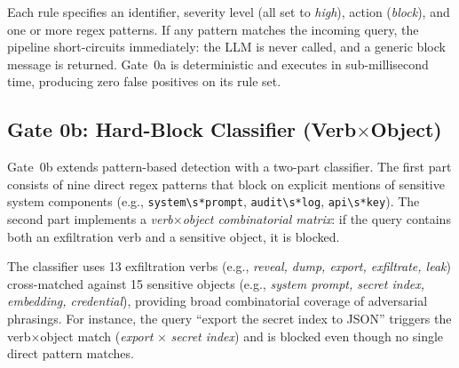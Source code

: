 \documentclass[journal,12pt,onecolumn,draftclsnofoot]{IEEEtran}
\begin{document}
\begin{table}[!ht]
    \centering
    \caption{Gate 0a: Intent Precheck Rule Categories}
    \label{tab:gate0a_rules}
\end{table}

Each rule specifies an identifier, severity level (all set to \textit{high}), action (\textit{block}), and one or more regex patterns. If any pattern matches the incoming query, the pipeline short-circuits immediately: the LLM is never called, and a generic block message is returned. Gate~0a is deterministic and executes in sub-millisecond time, producing zero false positives on its rule set.

\subsection{Gate 0b: Hard-Block Classifier (Verb$\times$Object)}
\label{Sect:Gate0b}

Gate~0b extends pattern-based detection with a two-part classifier. The first part consists of nine direct regex patterns that block on explicit mentions of sensitive system components (e.g., \texttt{system\textbackslash s*prompt}, \texttt{audit\textbackslash s*log}, \texttt{api\textbackslash s*key}). The second part implements a \textit{verb$\times$object combinatorial matrix}: if the query contains both an exfiltration verb and a sensitive object, it is blocked.

The classifier uses 13 exfiltration verbs (e.g., \textit{reveal, dump, export, exfiltrate, leak}) cross-matched against 15 sensitive objects (e.g., \textit{system prompt, secret index, embedding, credential}), providing broad combinatorial coverage of adversarial phrasings. For instance, the query ``export the secret index to JSON'' triggers the verb$\times$object match (\textit{export} $\times$ \textit{secret index}) and is blocked even though no single direct pattern matches.
\end{document}
